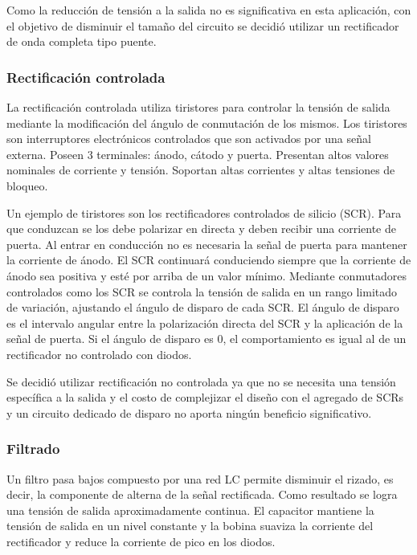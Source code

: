 Como la reducción de tensión a la salida no es significativa en esta aplicación,
con el objetivo de disminuir el tamaño del circuito se decidió utilizar un rectificador de onda completa tipo puente.

\subsubsection{Rectificación controlada}

La rectificación controlada utiliza tiristores para controlar la tensión de salida mediante la modificación del ángulo de conmutación de los mismos.
Los tiristores son interruptores electrónicos controlados que son activados por una señal externa. 
Poseen 3 terminales: ánodo, cátodo y puerta. Presentan altos valores nominales de corriente y tensión.
Soportan altas corrientes y altas tensiones de bloqueo. 

Un ejemplo de tiristores son los rectificadores controlados de silicio (SCR).
Para que conduzcan se los debe polarizar en directa y deben recibir una corriente de puerta. 
Al entrar en conducción no es necesaria la señal de puerta para mantener la corriente de ánodo. 
El SCR continuará conduciendo siempre que la corriente de ánodo sea positiva y esté por arriba de un valor mínimo. 
Mediante conmutadores controlados como los SCR se controla la tensión de salida en un rango limitado de variación, ajustando el ángulo de disparo de cada SCR. 
El ángulo de disparo es el intervalo angular entre la polarización directa del SCR y la aplicación de la señal de puerta. 
Si el ángulo de disparo es 0, el comportamiento es igual al de un rectificador no controlado con diodos. 

Se decidió utilizar rectificación no controlada ya que no se necesita una tensión específica a la salida
y el costo de complejizar el diseño con el agregado de SCRs y un circuito dedicado de disparo no aporta ningún beneficio significativo.

\subsubsection{Filtrado}

Un filtro pasa bajos compuesto por una red LC permite disminuir el rizado,
es decir, la componente de alterna de la señal rectificada. 
Como resultado se logra una tensión de salida aproximadamente continua.
El capacitor mantiene la tensión de salida en un nivel constante y
la bobina suaviza la corriente del rectificador y reduce la corriente de pico en los diodos. 

